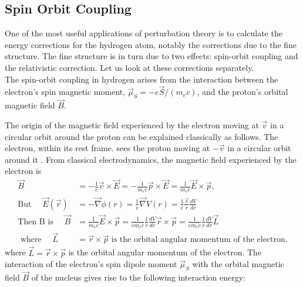 \subsection{Spin Orbit Coupling}
One of the most useful applications of perturbation theory is to calculate the energy corrections for the hydrogen atom, notably the corrections due to the fine structure. The fine structure is in turn due to two effects: spin-orbit coupling and the relativistic correction. Let us look at these corrections separately.\\
The spin-orbit coupling in hydrogen arises from the interaction between the electron's spin magnetic moment, $\vec{\mu}_{S}=-e \vec{S} /\left(m_{e} c\right)$, and the proton's orbital magnetic field $\vec{B}$.

The origin of the magnetic field experienced by the electron moving at $\vec{v}$ in a circular orbit around the proton can be explained classically as follows. The electron, within its rest frame. sees the proton moving at $-\vec{v}$ in a circular orbit around it . From classical electrodynamics, the magnetic field experienced by the electron is
	$$
	\begin{aligned}
	\vec{B}&=-\frac{1}{c} \vec{v} \times \vec{E}=-\frac{1}{m_{e} c} \vec{p} \times \vec{E}=\frac{1}{m_{e} c} \vec{E} \times \vec{p},\\
	\text{But }\quad\vec{E}(\vec{r})&=-\vec{\nabla} \phi(r)=\frac{1}{e} \vec{\nabla} V(r)=\frac{1}{e} \frac{\vec{r}}{r} \frac{d V}{d r} \\
	\text{Then B is }\quad\vec{B}&=\frac{1}{m_{e} c} \vec{E} \times \vec{p}=\frac{1}{e m_{e} c} \frac{1}{r} \frac{d V}{d r} \vec{r} \times \vec{p}=\frac{1}{e m_{e} c} \frac{1}{r} \frac{d V}{d r} \vec{L}\\
\text{	where }\quad\vec{L}&=\vec{r} \times \vec{p}\text{ is the orbital angular momentum of the electron.}
\end{aligned}
$$
where $\vec{L}=\vec{r} \times \vec{p}$ is the orbital angular momentum of the electron.
The interaction of the electron's spin dipole moment $\vec{\mu}_{S}$ with the orbital magnetic field $\vec{B}$ of the nucleus gives rise to the following interaction energy:
